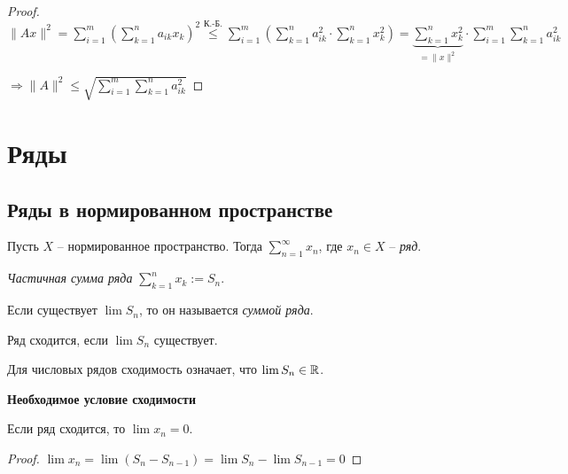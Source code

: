 \begin{proof}
    $\|Ax\|^2=\sum\limits_{i=1}^m(\sum\limits_{k=1}^n a_{ik}x_k)^2\overset{\text{К.-Б.}}{\leq}\sum\limits_{i=1}^m(\sum\limits_{k=1}^n a^2_{ik}\cdot \sum\limits_{k=1}^n x_k^2)=\underbrace{\sum\limits_{k=1}^n x^2_k}_{=\|x\|^2}\cdot \sum\limits_{i=1}^m\sum\limits_{k=1}^n a^2_{ik}$

    $\Rightarrow \|A\|^2\leq \sqrt{\sum\limits_{i=1}^m\sum\limits_{k=1}^n a^2_{ik}}$
\end{proof}

\newpage
\section{Ряды}

\subsection{Ряды в нормированном пространстве}

\begin{definition}
    Пусть $X$ – нормированное пространство. Тогда $\sum\limits_{n=1}^\infty x_n$, где $x_n\in X$ – \textit{ряд}.

    \textit{Частичная сумма ряда} $\sum\limits_{k=1}^nx_k:=S_n$.

    Если существует $\lim S_n$, то он называется \textit{суммой ряда}.

    Ряд сходится, если $\lim S_n$ существует.
\end{definition}

\begin{remark} Для числовых рядов сходимость означает, что $\lim S_n\in \mathbb{R}$.
\end{remark}

\begin{theorem}
    \textbf{{Необходимое} условие сходимости}

    Если ряд сходится, то $\lim x_n=0$.
\end{theorem}

\begin{proof}
    $\lim x_n=\lim (S_n-S_{n-1})=\lim S_n-\lim S_{n-1}=0$
\end{proof}

